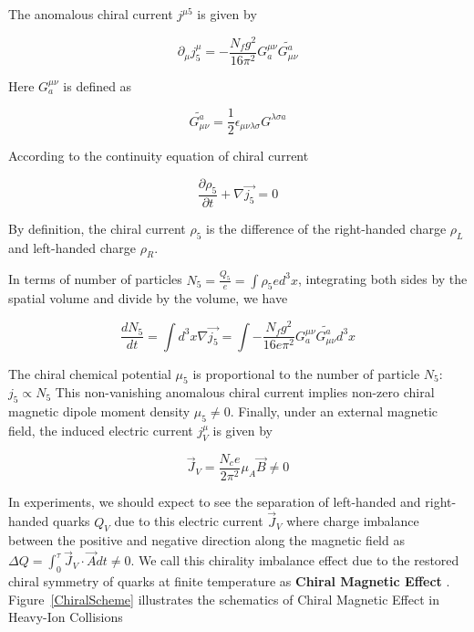 The anomalous chiral current $j^{\mu 5}$ is given by \cite{ChiralPaper}

\begin{equation}
\partial_\mu j^{\mu}_{5} =  - \frac{N_{f}g^2}{16 \pi^2} G^{\mu\nu}_a \widetilde{G^a_{\mu\nu}}
\end{equation}

Here $G^{\mu\nu}_a$ is defined as

\begin{equation}
\widetilde{G^a_{\mu\nu}} = \frac{1}{2} \epsilon_{\mu\nu\lambda\sigma}G^{\lambda\sigma a}
\end{equation}


According to the continuity equation of chiral current

\begin{equation}
\frac{\partial \rho_5}{\partial t} + \nabla \vec{j_5} = 0 
\end{equation}

By definition, the chiral current $\rho_5$ is the difference of the right-handed charge $\rho_L$ and left-handed charge $\rho_R$.


In terms of number of particles $N_5 = \frac{Q_5}{e} = \int  {\rho_5}{e} d^3x$, integrating both sides by the spatial volume and divide by the volume, we have



\begin{equation}
\frac{d N_5}{dt} =  \int d^3x \nabla \vec{j_5} = \int  - \frac{N_{f}g^2}{16e \pi^2} G^{\mu\nu}_a \widetilde{G^a_{\mu\nu}} d^3x 
\end{equation}


The chiral chemical potential $\mu_5$ is proportional to the number of particle $N_5$: $j_5 \propto N_5$ This non-vanishing anomalous chiral current implies non-zero chiral magnetic dipole moment density $\mu_5 \ne 0$. Finally, under an external magnetic field, the induced electric current $j^\mu_V$ is given by  


\begin{equation}
\vec J_V = \frac{N_c e}{2\pi^2} \mu_A \vec B \ne 0
\end{equation}

In experiments, we should expect to see the separation of left-handed and right-handed quarks $Q_V$ due to this electric current $\vec J_V$ where charge imbalance between the positive and negative direction along the magnetic field \cite{CMESignature} as $\Delta Q = \int_0^\tau \vec J_V \cdot \vec A dt \ne 0$. We call this chirality imbalance effect due to the restored chiral symmetry of quarks at finite temperature as \textbf{Chiral Magnetic Effect} \cite{RestoreCME}. Figure~\ref{ChiralScheme} illustrates the schematics of Chiral Magnetic Effect in Heavy-Ion Collisions \cite{CMEFigPaper}

